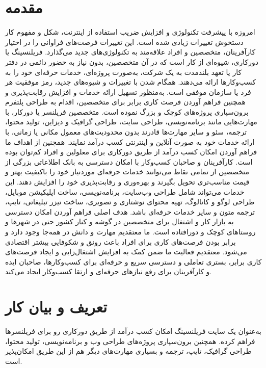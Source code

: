 

\section*{مقدمه}
امروزه با پیشرفت تکنولوژی و افزایش ضریب استفاده از اینترنت، شکل و مفهوم کار دستخوش تغییرات زیادی شده است. این تغییرات فرصت‌های فراوانی را در اختیار کارآفرینان، متخصصین و افراد علاقه‌مند به تکنولوژی‌های جدید می‌گذارد.
فریلنسینگ یا دورکاری، شیوه‌ای از کار است که در آن متخصصین، بدون نیاز به حضور دائمی در دفتر کار یا تعهد بلندمدت به یک شرکت، به‌صورت پروژه‌ای، خدمات حرفه‌ای خود را به کسب‌وکارها ارائه می‌دهند. همگام شدن با تغییرات و شیوه‌های جدید، رمز موفقیت هر فرد یا سازمان موفقی است. به‌منظور تسهیل ارائه خدمات و افزایش رقابت‌پذیری و همچنین فراهم آوردن فرصت کاری برابر برای متخصصین، اقدام به طراحی پلتفرم برون‌سپاری پروژه‌های کوچک و بزرگ نموده است.
 متخصصین فریلنسر یا دورکار، با مهارت‌هایی مانند برنامه‌نویسی، طراحی سایت، طراحی گرافیک و دیزاین، تولید محتوا، ترجمه، سئو و سایر مهارت‌ها قادرند بدون محدودیت‌های معمول مکانی یا زمانی، با ارائه خدمات خود به صورت آنلاین و اینترنتی کسب درآمد نمایند. همچنین از اهداف ما فراهم آوردن امکان کسب درآمد از طریق دورکاری برای معلولین و افراد کم‌توان بوده است. کارآفرینان و صاحبان کسب‌وکار با امکان دسترسی به بانک اطلاعاتی بزرگی از متخصصین از تمامی نقاط می‌توانند خدمات حرفه‌ای موردنیاز خود را باکیفیت بهتر و قیمت مناسب‌تری تحویل بگیرند و بهره‌وری و رقابت‌پذیری خود را افزایش دهند. این خدمات می‌تواند شامل طراحی وب‌سایت، برنامه‌نویسی، ساخت اپلیکیشن موبایل، طراحی لوگو و کاتالوگ، تهیه محتوای نوشتاری و تصویری، ساخت تیزر تبلیغاتی، تایپ، ترجمه متون و سایر خدمات حرفه‌ای باشد.
هدف اصلی فراهم آوردن امکان دسترسی به بازار کار و اشتغال برای متخصصین در گوشه و کنار کشور حتی در شهرها و روستاهای کوچک و دورافتاده است. ما معتقدیم مهارت و دانش در همه‌جا وجود دارد و برابر بودن فرصت‌های کاری برای افراد باعث رونق و شکوفایی بیشتر اقتصادی می‌شود. معتقدیم فعالیت ما ضمن کمک به افزایش اشتغال‌زایی و ایجاد فرصت‌های کاری برابر، بستری تعاملی و دسترسی سریع و حرفه‌ای برای کسب‌وکارها، صاحبان ایده و کارآفرینان برای رفع نیازهای حرفه‌ای و ارتقا کسب‌وکار ایجاد می‌کند.
\section{تعریف و بیان کار}
 به‌عنوان یک سایت فریلنسینگ امکان کسب درآمد از طریق دورکاری رو برای فریلنسرها فراهم کرده. همچنین برون‌سپاری پروژه‌های طراحی وب و برنامه‌نویسی، تولید محتوا، طراحی گرافیک، تایپ، ترجمه و بسیاری مهارت‌های دیگر هم از این طریق امکان‌پذیر است.

